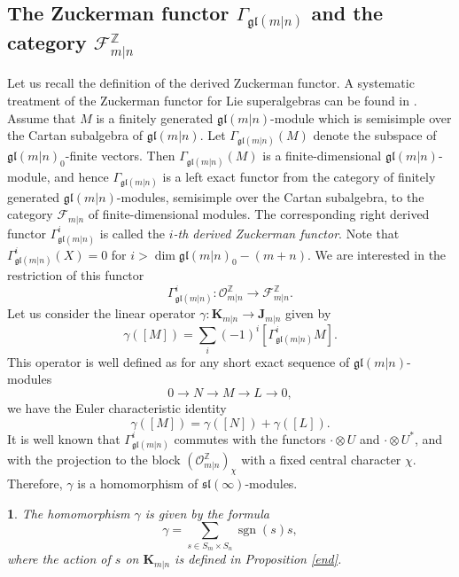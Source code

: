 \documentclass[12pt,oneside,english]{amsart}
\numberwithin{equation}{section}
\numberwithin{figure}{section}
\theoremstyle{plain}
\theoremstyle{plain}
\theoremstyle{remark}
\theoremstyle{definition}
\theoremstyle{plain}
\theoremstyle{remark}
\theoremstyle{definition}
\theoremstyle{plain}
\theoremstyle{plain}
\newtheorem{prop}[thm]{\protect\propositionname}
\theoremstyle{definition}
\providecommand{\propositionname}{Proposition}
\newcommand{\bK}{\mathbf{K}}
\newcommand{\bJ}{\mathbf{J}}
\begin{document}
  \subsection{The Zuckerman functor $\Gamma_{\mathfrak{gl}(m|n)}$ and
    the category $\mathcal F_{m|n}^{\mathbb Z}$}
  Let us recall the definition of the derived Zuckerman functor. A systematic treatment of the Zuckerman functor for Lie superalgebras can be found in \cite{S}.
  Assume that $M$ is a finitely generated $\mathfrak{gl}(m|n)$-module which is  semisimple over the
  Cartan subalgebra of $\mathfrak{gl}(m|n)$. Let $\Gamma_{\mathfrak{gl}(m|n)}(M)$ denote the subspace of $\mathfrak{gl}(m|n)_0$-finite vectors. Then
  $\Gamma_{\mathfrak{gl}(m|n)}(M)$ is a finite-dimensional $\mathfrak{gl}(m|n)$-module, and hence $\Gamma_{\mathfrak{gl}(m|n)}$ is a left exact functor from the category
  of finitely generated $\mathfrak{gl}(m|n)$-modules, semisimple over the Cartan subalgebra, to the category $\mathcal F_{m|n}$ of finite-dimensional modules. The corresponding right derived functor $\Gamma^i_{\mathfrak{gl}(m|n)}$ is called the \emph{$i$-th derived Zuckerman functor}. Note that $\Gamma^i_{\mathfrak{gl}(m|n)}(X)=0$ for
  $i>\dim{\mathfrak{gl}(m|n)_0}-(m+n)$. We are interested in the restriction of this functor
    $$\Gamma^i_{\mathfrak{gl}(m|n)}:\mathcal O_{m|n}^{\mathbb Z}\to \mathcal F_{m|n}^{\mathbb Z}.$$
    Let us consider the linear operator $\gamma:\bK_{m|n}\to\bJ_{m|n}$ given by
    $$\gamma([M])=\sum_i(-1)^i[\Gamma^i_{\mathfrak{gl}(m|n)} M].$$
    This operator is well defined as for any short exact sequence of $\mathfrak{gl}(m|n)$-modules
    $$0\to N\to M\to L\to 0,$$
    we have the Euler characteristic identity
    $$\gamma ([M])=\gamma ([N])+\gamma ([L]).$$
      It is well known that     $\Gamma^i_{\mathfrak{gl}(m|n)}$  commutes with the functors $\cdot\otimes U$ and $\cdot\otimes U^*$, and with the projection to the
      block  $(\mathcal O_{m|n}^{\mathbb Z})_{\chi}$ with a
      fixed central character $\chi$. Therefore, $\gamma$
    is a homomorphism of $\mathfrak{sl}(\infty)$-modules.
    \begin{prop}\label{Zuckerman} The homomorphism $\gamma$ is given by the formula
      \begin{equation}\label{gamma} \gamma=\sum_{s\in S_m\times S_n}\operatorname{sgn}(s) s,\end{equation}
      where the action of $s$ on $\bK_{m|n}$ is defined in Proposition \ref{end}.
    \end{prop}
\end{document}
